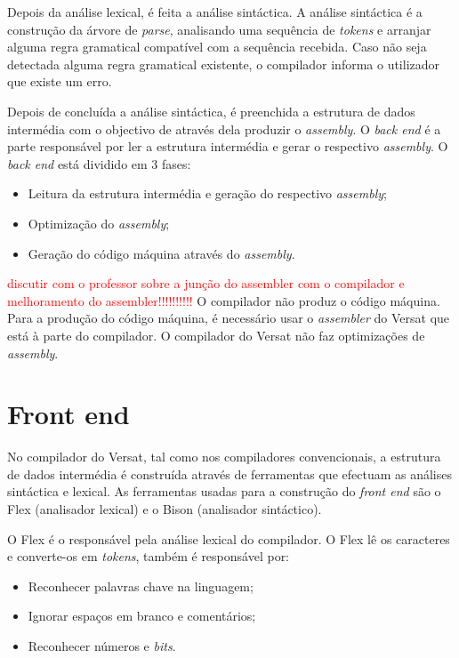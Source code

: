 Depois da análise lexical, é feita a análise sintáctica. A análise sintáctica é a construção da árvore de {\it parse}, analisando uma sequência de {\it tokens} 
e arranjar alguma regra gramatical compatível com a sequência recebida. Caso não seja detectada alguma regra gramatical existente, o compilador informa o utilizador que existe um erro.

Depois de concluída a análise sintáctica, é preenchida a estrutura de dados intermédia com o objectivo de através dela produzir o {\it assembly}.
O {\it back end} é a parte responsável por ler a estrutura intermédia e gerar o respectivo {\it assembly}. O {\it back end} está dividido em 3 fases:

\begin{itemize}
  \item Leitura da estrutura intermédia e geração do respectivo {\it assembly};
  \item Optimização do {\it assembly};
  \item Geração do código máquina através do {\it assembly}.
\end{itemize}

\textcolor{red}{discutir com o professor sobre a junção do assembler com o compilador e melhoramento do assembler!!!!!!!!!!}
O compilador não produz o código máquina. Para a produção do código máquina, é necessário usar o {\it assembler} do Versat que está à parte do compilador. 
O compilador do Versat não faz optimizações de {\it assembly}.

\section{Front end}
\label{chapter:front end}

No compilador do Versat, tal como nos compiladores convencionais, a estrutura de dados intermédia é construída através de ferramentas que efectuam as análises sintáctica e lexical.
As ferramentas usadas para a construção do {\it front end} são o Flex (analisador lexical) e o Bison (analisador sintáctico).

O Flex é o responsável pela análise lexical do compilador. O Flex lê os caracteres e converte-os em {\it tokens}, também é responsável por:

\begin{itemize}
  \item Reconhecer palavras chave na linguagem;
  \item Ignorar espaços em branco e comentários;
  \item Reconhecer números e {\it bits}.
\end{itemize}

